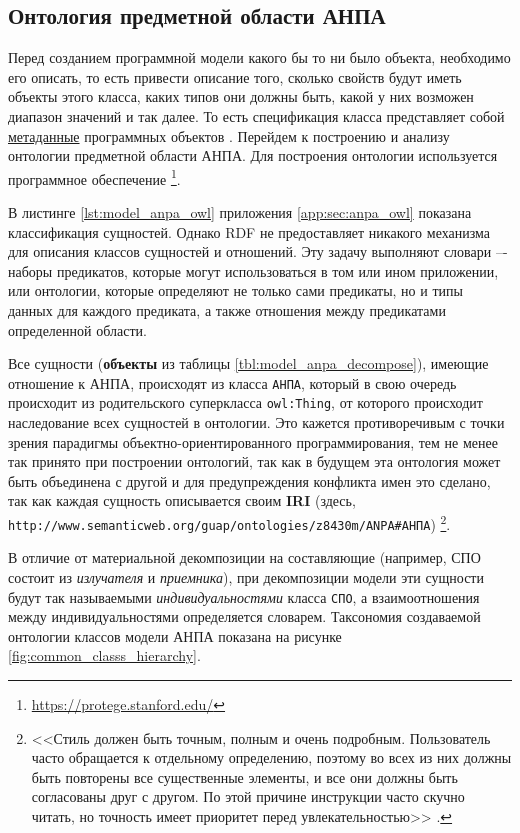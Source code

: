 \subsection{Онтология предметной области АНПА}

Перед созданием программной модели какого бы то ни было объекта, необходимо его описать,
то есть привести описание того, сколько свойств будут иметь объекты этого класса,
каких типов они должны быть, какой у них возможен диапазон значений и так далее.
То есть спецификация класса представляет собой \underline{метаданные} программных объектов \cite{journal:vestnik_spbgu:ivakin}.
Перейдем к построению и анализу онтологии предметной области АНПА.
Для построения онтологии используется программное обеспечение
\protege\footnote{\url{https://protege.stanford.edu/}}.

В листинге \ref{lst:model_anpa_owl} приложения \ref{app:sec:anpa_owl} показана
классификация сущностей.
%
Однако RDF не предоставляет никакого механизма для описания классов сущностей и
отношений. Эту задачу выполняют словари –- наборы предикатов, которые могут
использоваться в том или ином приложении, или онтологии, которые определяют не только
сами предикаты, но и типы данных для каждого предиката, а также отношения между
предикатами определенной области.

Все сущности (\textbf{объекты} из таблицы \ref{tbl:model_anpa_decompose}), имеющие отношение к АНПА, происходят из класса \texttt{АНПА},
который в свою очередь происходит из родительского суперкласса \texttt{owl:Thing},
от которого происходит наследование всех сущностей в онтологии.
Это кажется противоречивым с точки зрения парадигмы объектно-ориентированного программирования,
тем не менее так принято при построении онтологий, так как в будущем эта онтология может быть объединена с другой
и для предупреждения конфликта имен это сделано, так как каждая сущность описывается своим \textbf{IRI}
(здесь, \texttt{http://www.semanticweb.org/guap/ontologies/z8430m/ANPA\#АНПА}) \cite[раздел 2.1]{journal:vestnik_vgtu:shapkin}\footnote{%
<<Стиль должен быть точным, полным и очень подробным. Пользователь часто обращается к отдельному определению,
    поэтому во всех из них должны быть повторены все существенные элементы, и все они должны быть согласованы друг с другом.
    По этой причине инструкции часто скучно читать, но точность имеет приоритет перед увлекательностью>> \cite[гл.~6]{book:bruks:myth_mount_man}.
}.

В отличие от материальной декомпозиции на составляющие (например, СПО состоит из \textit{излучателя} и \textit{приемника}),
при декомпозиции модели эти сущности будут так называемыми \textit{индивидуальностями} класса \texttt{СПО},
а взаимоотношения между индивидуальностями определяется словарем.
Таксономия создаваемой онтологии классов модели АНПА показана на рисунке \ref{fig:common_classs_hierarchy}.

